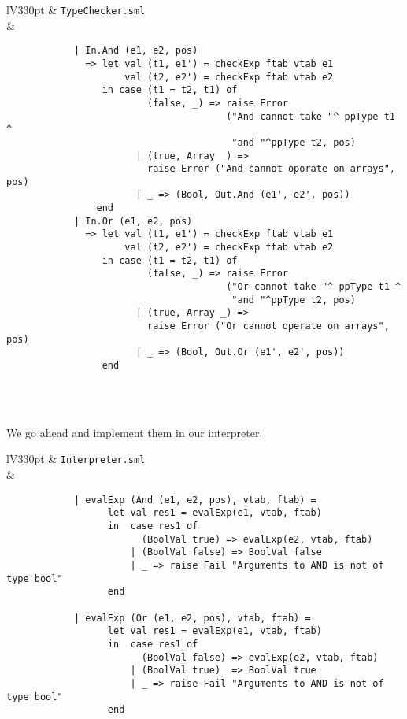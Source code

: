 \documentclass[a4paper]{article}
\begin{document}
\begin{center}	
	\begin{tabular}{lV{330pt}}
		\toprule
		& \verb|TypeChecker.sml|\\
		\midrule
		&
		\begin{verbatim}
			| In.And (e1, e2, pos)
			  => let val (t1, e1') = checkExp ftab vtab e1
			         val (t2, e2') = checkExp ftab vtab e2
			     in case (t1 = t2, t1) of
			             (false, _) => raise Error
			                           ("And cannot take "^ ppType t1 ^
			                            "and "^ppType t2, pos)
			           | (true, Array _) => 
			             raise Error ("And cannot oporate on arrays", pos)
			           | _ => (Bool, Out.And (e1', e2', pos))
			    end
			| In.Or (e1, e2, pos)
			  => let val (t1, e1') = checkExp ftab vtab e1
			         val (t2, e2') = checkExp ftab vtab e2
			     in case (t1 = t2, t1) of
			             (false, _) => raise Error 
			                           ("Or cannot take "^ ppType t1 ^
			                            "and "^ppType t2, pos)
			           | (true, Array _) => 
			             raise Error ("Or cannot operate on arrays", pos)
			           | _ => (Bool, Out.Or (e1', e2', pos))
			     end
		\end{verbatim}
		\\
		\bottomrule \\
	\end{tabular}
\end{center}

We go ahead and implement them in our interpreter.

\begin{center}	
	\begin{tabular}{lV{330pt}}
		\toprule
		& \verb|Interpreter.sml|\\
		\midrule
		&
		\begin{verbatim}
			| evalExp (And (e1, e2, pos), vtab, ftab) =
			      let val res1 = evalExp(e1, vtab, ftab)
			      in  case res1 of
			            (BoolVal true) => evalExp(e2, vtab, ftab)
			          | (BoolVal false) => BoolVal false
			          | _ => raise Fail "Arguments to AND is not of type bool"
			      end
			  
			| evalExp (Or (e1, e2, pos), vtab, ftab) =
			      let val res1 = evalExp(e1, vtab, ftab)
			      in  case res1 of
			            (BoolVal false) => evalExp(e2, vtab, ftab)
			          | (BoolVal true)  => BoolVal true
			          | _ => raise Fail "Arguments to AND is not of type bool"
			      end
		\end{verbatim}
		\\
		\bottomrule \\
	\end{tabular}
\end{center}
\end{document}
